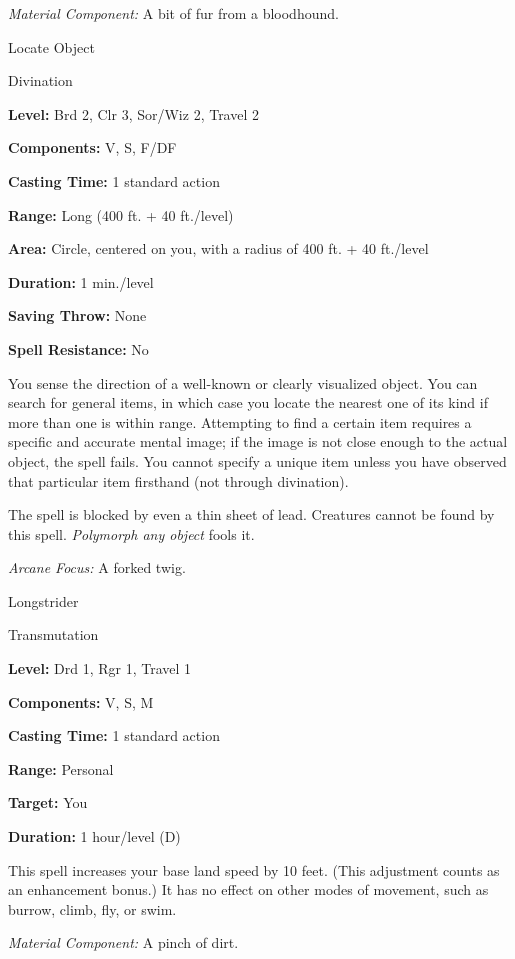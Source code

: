 \documentclass{article}
\begin{document}
\textit{Material Component: }A bit of fur from a bloodhound.

\vspace{12pt}
Locate Object

Divination

\textbf{Level:} Brd 2, Clr 3, Sor/Wiz 2, Travel 2

\textbf{Components:} V, S, F/DF

\textbf{Casting Time:} 1 standard action

\textbf{Range:} Long (400 ft. + 40 ft./level)

\textbf{Area:} Circle, centered on you, with a radius of 400 ft. + 40 ft./level

\textbf{Duration:} 1 min./level

\textbf{Saving Throw:} None

\textbf{Spell Resistance:} No

You sense the direction of a well-known or clearly visualized object. You can search 
for general items, in which case you locate the nearest one of its kind if more 
than one is within range. Attempting to find a certain item requires a specific 
and accurate mental image; if the image is not close enough to the actual object, 
the spell fails. You cannot specify a unique item unless you have observed that 
particular item firsthand (not through divination).

The spell is blocked by even a thin sheet of lead. Creatures cannot be found by 
this spell. \textit{Polymorph any object }fools it.

\textit{Arcane Focus: }A forked twig.

\vspace{12pt}
Longstrider

Transmutation

\textbf{Level:} Drd 1, Rgr 1, Travel 1

\textbf{Components:} V, S, M

\textbf{Casting Time:} 1 standard action

\textbf{Range:} Personal

\textbf{Target:} You

\textbf{Duration:} 1 hour/level (D)

This spell increases your base land speed by 10 feet. (This adjustment counts as 
an enhancement bonus.) It has no effect on other modes of movement, such as burrow, 
climb, fly, or swim.

\textit{Material Component: }A pinch of dirt.
\end{document}
